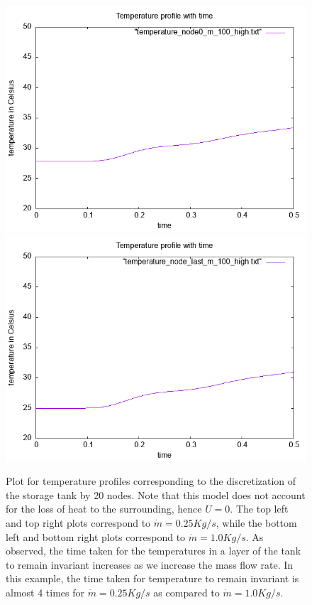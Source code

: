 \documentclass{article}
\begin{document}
\begin{figure}[ht]
\includegraphics[scale =0.4]{figures/temperature_node0_N_20_m_100.png}
\includegraphics[scale =0.4]{figures/temperature_node_last_N_20_m_100.png}
\caption{Plot for temperature profiles corresponding to the discretization of the storage tank by 20 nodes. Note that this model does not account for the loss of heat to the surrounding, hence $U = 0$. The top left and top right plots correspond to $\dot{m} = 0.25 Kg/s$, while the bottom left and bottom right plots correspond to $\dot{m} = 1.0 Kg/s$. As observed, the time taken for the temperatures in a layer of the tank to remain invariant increases as we increase the mass flow rate. In this example, the time taken for temperature to remain invariant is almost 4 times for $\dot{m} = 0.25 Kg/s$ as compared to $\dot{m} = 1.0 Kg/s$.}
\end{figure}
\end{document}
